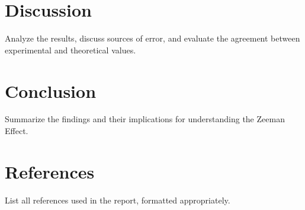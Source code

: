 \documentclass[a4paper,12pt]{article}
\begin{document}
\section{Discussion}
Analyze the results, discuss sources of error, and evaluate the agreement between experimental and theoretical values.

\section{Conclusion}
Summarize the findings and their implications for understanding the Zeeman Effect.

\section*{References}
List all references used in the report, formatted appropriately.
\end{document}
